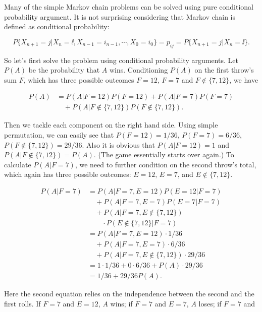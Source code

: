 \begin{solution}
Many of the simple Markov chain problems can be solved using pure conditional probability
argument. It is not surprising considering that Markov chain is defined as conditional
probability:

\[
P\{X_{n+1}=j\vert X_n=\ii,X_{n-1}=i_{n-1},\cdots,X_0=i_0\}
=p_{ij}=P\{X_{n+1}=j\vert X_n=\ii\}.
\]

So let's first solve the problem using conditional probability arguments. Let $P(A)$ be
the probability that $A$ wins. Conditioning $P(A)$ on the first throw's sum $F$, which has
three possible outcomes $F=12$, $F=7$ and $F\notin\{7,12\}$, we have

\[
\begin{aligned}
P(A)&=P(A\vert F=12)P(F=12)+P(A\vert F=7)P(F=7)\\
&\quad+P(A\vert F\notin\{7,12\})P(F\notin\{7,12\}).
\end{aligned}
\]

Then we tackle each component on the right hand side. Using simple permutation, we can
easily see that $P(F=12)=1/36$, $P(F=7)=6/36$, $P(F\notin\{7,12\})=29/36$. Also it
is obvious that $P(A\vert F=12)=1$ and $P(A\vert F\notin\{7,12\})=P(A)$. (The game
essentially starts over again.) To calculate $P(A\vert F=7)$, we need to further condition
on the second throw's total, which again has three possible outcomes: $E=12$, $E=7$, and
$E\notin\{7,12\}$.

\[
\begin{aligned}
P(A\vert F=7)
&=P(A\vert F=7,E=12)P(E=12\vert F=7)\\
&\quad+P(A\vert F=7,E=7)P(E=7\vert F=7)\\
&\quad+P(A\vert F=7,E\notin\{7,12\})\\
&\qquad{}\cdot P(E\notin\{7,12\}\vert F=7)\\
&=P(A\vert F=7,E=12)\cdot1/36\\
&\quad+P(A\vert F=7,E=7)\cdot6/36\\
&\quad+P(A\vert F=7,E\notin\{7,12\})\cdot29/36\\
&=1\cdot1/36+0\cdot6/36+P(A)\cdot29/36\\
&=1/36+29/36P(A).
\end{aligned}
\]

Here the second equation relies on the independence between the second and the first
rolls. If $F=7$ and $E=12$, $A$ wins; if $F=7$ and $E=7$, $A$ loses; if $F=7$ and



\end{solution}
